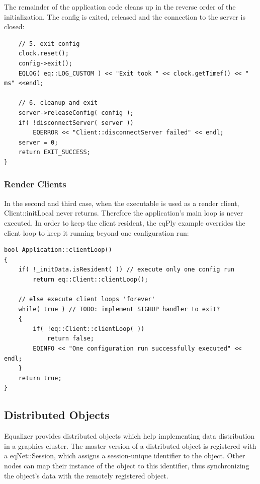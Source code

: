 \documentclass[10pt,a4]{scrartcl}
\begin{document}
The remainder of the application code cleans up in the reverse order of
the initialization. The config is exited, released and the connection to
the server is closed:

{\footnotesize\begin{lstlisting}
    // 5. exit config
    clock.reset();
    config->exit();
    EQLOG( eq::LOG_CUSTOM ) << "Exit took " << clock.getTimef() << " ms" <<endl;

    // 6. cleanup and exit
    server->releaseConfig( config );
    if( !disconnectServer( server ))
        EQERROR << "Client::disconnectServer failed" << endl;
    server = 0;
    return EXIT_SUCCESS;
}
\end{lstlisting}}%

\subsubsection{Render Clients}

In the second and third case, when the executable is used as a render
client, \textsf{Client::initLocal} never returns. Therefore the
application's main loop is never executed. In order to keep the client
resident, the \textsf{eqPly} example overrides the client loop to keep
it running beyond one configuration run:

{\footnotesize\begin{lstlisting}
bool Application::clientLoop()
{
    if( !_initData.isResident( )) // execute only one config run
        return eq::Client::clientLoop();

    // else execute client loops 'forever'
    while( true ) // TODO: implement SIGHUP handler to exit?
    {
        if( !eq::Client::clientLoop( ))
            return false;
        EQINFO << "One configuration run successfully executed" << endl;
    }
    return true;
}
\end{lstlisting}}%


\subsection{Distributed Objects}

Equalizer provides distributed objects which help implementing data
distribution in a graphics cluster. The master version of a distributed
object is registered with a \textsf{eqNet::Session}, which assigns a
session-unique identifier to the object. Other nodes can map their
instance of the object to this identifier, thus synchronizing the
object's data with the remotely registered object.
\end{document}

